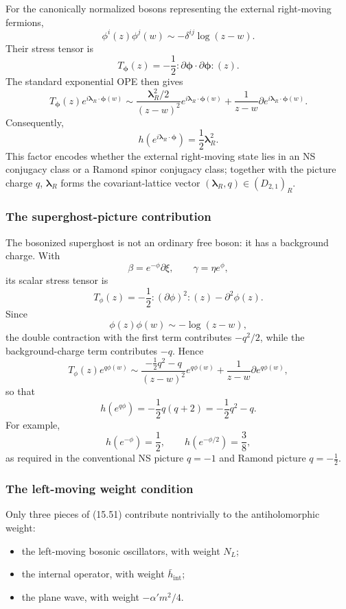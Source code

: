 \documentclass[
  10pt,
  a4paper,
  openany]{book}
\providecommand{\tightlist}{%
  \setlength{\itemsep}{0pt}\setlength{\parskip}{0pt}}
\begin{document}
For the canonically normalized bosons representing the external
right-moving fermions, \[
\phi^i(z)\phi^j(w)
\sim
-\delta^{ij}\log(z-w).
\] Their stress tensor is \[
T_{\boldsymbol\phi}(z)
=
-\frac12:\!\partial\boldsymbol\phi\cdot
\partial\boldsymbol\phi\!:(z).
\] The standard exponential OPE then gives \[
T_{\boldsymbol\phi}(z)
e^{i\boldsymbol\lambda_R\cdot\boldsymbol\phi(w)}
\sim
\frac{\boldsymbol\lambda_R^2/2}{(z-w)^2}
e^{i\boldsymbol\lambda_R\cdot\boldsymbol\phi(w)}
+\frac1{z-w}\partial
e^{i\boldsymbol\lambda_R\cdot\boldsymbol\phi(w)}.
\] Consequently, \[
\boxed{
h\left(e^{i\boldsymbol\lambda_R\cdot\boldsymbol\phi}\right)
=\frac12\boldsymbol\lambda_R^2.
}
\] This factor encodes whether the external right-moving state lies in
an NS conjugacy class or a Ramond spinor conjugacy class; together with
the picture charge \(q\), \(\boldsymbol\lambda_R\) forms the
covariant-lattice vector \((\boldsymbol\lambda_R,q)\in(D_{2,1})_R\).

\subsubsection{The superghost-picture
contribution}\label{the-superghost-picture-contribution}

The bosonized superghost is not an ordinary free boson: it has a
background charge. With \[
\beta=e^{-\phi}\partial\xi,
\qquad
\gamma=\eta e^\phi,
\] its scalar stress tensor is \[
T_\phi(z)
=
-\frac12:\!(\partial\phi)^2\!:(z)
-\partial^2\phi(z).
\] Since \[
\phi(z)\phi(w)\sim-\log(z-w),
\] the double contraction with the first term contributes \(-q^2/2\),
while the background-charge term contributes \(-q\). Hence \[
T_\phi(z)e^{q\phi(w)}
\sim
\frac{-\frac12q^2-q}{(z-w)^2}e^{q\phi(w)}
+\frac1{z-w}\partial e^{q\phi(w)},
\] so that \[
\boxed{
h(e^{q\phi})
=
-\frac12q(q+2)
=
-\frac12q^2-q.
}
\] For example, \[
h(e^{-\phi})=\frac12,
\qquad
h(e^{-\phi/2})=\frac38,
\] as required in the conventional NS picture \(q=-1\) and Ramond
picture \(q=-\frac12\).

\subsubsection{The left-moving weight
condition}\label{the-left-moving-weight-condition}

Only three pieces of (15.51) contribute nontrivially to the
antiholomorphic weight:

\begin{itemize}
\tightlist
\item
  the left-moving bosonic oscillators, with weight \(N_L\);
\item
  the internal operator, with weight \(\bar h_{\mathrm{int}}\);
\item
  the plane wave, with weight \(-\alpha'm^2/4\).
\end{itemize}
\end{document}
